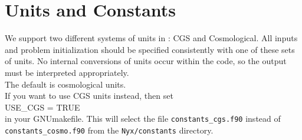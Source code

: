 \section{Units and Constants}

We support two different systems of units in \nyx: CGS and Cosmological.
All inputs and problem initialization should be specified consistently with one of these sets of units.  
No internal conversions of units occur within the code, so the output must be interpreted appropriately. \\

\noindent The default is cosmological units. \\

\noindent If you want to use CGS units instead, then set \\

\noindent USE\_CGS = TRUE  \\

\noindent in your GNUmakefile.  This will select the file
{\tt constants\_cgs.f90}  instead of {\tt constants\_cosmo.f90} from the
{\tt Nyx/constants} directory. 

